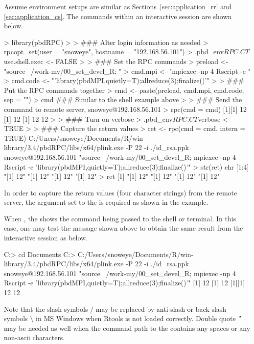 Assume environment setups are similar as Sections~\ref{sec:application_rr} and
\ref{sec:application_cs}.
The  commands within an interactive  session
are shown below.
\begin{Code}[title=\pkg{pbdRPC} in local and \pkg{pbdMPI} in remote]
> library(pbdRPC)
>
> ### Alter login information as needed
> rpcopt_set(user = "snoweye", hostname = "192.168.56.101")
> .pbd_env$RPC.CT$use.shell.exec <- FALSE
>
> ### Set the RPC commands
> preload <- "source ~/work-my/00_set_devel_R; "
> cmd.mpi <- "mpiexec -np 4 Rscript -e "
> cmd.code <- "'library(pbdMPI,quietly=T);allreduce(3);finalize()'"
>
> ### Put the RPC commands together
> cmd <- paste(preload, cmd.mpi, cmd.code, sep = "")
> cmd  ### Similar to the shell example above
>
> ### Send the command to remote server, snoweye@192.168.56.101
> rpc(cmd = cmd)
[1][1] 12
[1] 12
[1] 12
12
>
> ### Turn on verbose
> .pbd_env$RPC.CT$verbose <- TRUE
>
> ### Capture the return values
> ret <- rpc(cmd = cmd, intern = TRUE)
C:/Uners/snoweye/Documents/R/win-library/3.4/pbdRPC/libs/x64/plink.exe -P 22 -i ./id_rsa.ppk  snoweye@192.168.56.101 "source ~/work-my/00_set_devel_R; mpiexec -np 4 Rscript -e 'library(pbdMPI,quietly=T);allreduce(3);finalize()'"
> str(ret)
 chr [1:4] "[1] 12" "[1] 12" "[1] 12" "[1] 12"
> ret
[1] "[1] 12" "[1] 12" "[1] 12" "[1] 12"
\end{Code}
In order to capture the return values (four character strings) from the
remote server, the argument  set to the 
is required as shown in the example.

When , the  shows the command being passed
to the shell or terminal. In this case, one may test the message shown above
to obtain the same result from the interactive  session as
below.
\begin{Command}[title=From a \code{cmd.exe} command prompt windows]
C:\Users\snoweye> cd Documents
C:\Users\snoweye\Documents> 
C:/Users/snoweye/Documents/R/win-library/3.4/pbdRPC/libs/x64/plink.exe -P 22 -i ./id_rsa.ppk  snoweye@192.168.56.101 "source ~/work-my/00_set_devel_R; mpiexec -np 4 Rscript -e 'library(pbdMPI,quietly=T);allreduce(3);finalize()'"
[1] 12
[1] 12
[1][1] 12
 12
\end{Command}
Note that the slash symbols $/$ may be replaced by anti-slash or back slash
symbols $\setminus$ in MS Windows when Rtools is not loaded correctly.
Double quote $"$ may be needed as well when the command path to the
 contains any spaces or any non-ascii characters.

